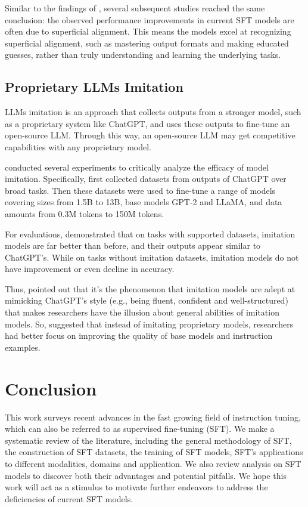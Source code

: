 \documentclass[11pt]{article}
\begin{document}
Similar to the findings of \citet{Kung2023DoMR}, several subsequent studies \cite{Zhou2023LIMALI, lin2023unlocking} reached the same conclusion: the observed performance improvements in current SFT models are often due to superficial alignment. This means the models excel at recognizing superficial alignment, such as mastering output formats and making educated guesses, rather than truly understanding and learning the underlying tasks.


\subsection{Proprietary LLMs Imitation}
LLMs imitation is an approach that collects outputs from a stronger model, such as a proprietary system like ChatGPT, and uses these outputs to fine-tune an open-source LLM. Through this way, an open-source LLM may get competitive capabilities with any proprietary model.

\citet{gudibande2023false} conducted several experiments to critically analyze the efficacy of model imitation. Specifically, \citet{gudibande2023false} first collected datasets from outputs of ChatGPT over broad tasks. Then these datasets were used to fine-tune a range of models covering sizes from 1.5B to 13B, base models GPT-2 and LLaMA, and data amounts from 0.3M tokens to 150M tokens.

For evaluations, \citet{gudibande2023false} demonstrated that on tasks with supported datasets, imitation models are far better than before, and their outputs appear similar to ChatGPT's. While on tasks without imitation datasets, imitation models do not have improvement or even decline in accuracy. 

Thus, \citet{gudibande2023false} pointed out that it's the phenomenon that imitation models are adept at mimicking ChatGPT's style (e.g., being fluent, confident and well-structured) that makes researchers have the illusion about general abilities of imitation models. So, \citet{gudibande2023false} suggested that instead of imitating proprietary models, researchers had better focus on improving the quality of base models and instruction examples.

\section{Conclusion}
This work surveys recent advances in the fast growing field of instruction tuning, which can also be referred to as supervised fine-tuning (SFT). 
We make a systematic review of the literature, including the general methodology of SFT, 
the construction of SFT datasets, the training of SFT models, 
SFT's applications to different modalities, domains and application. 
We also review analysis on SFT models to discover both their advantages and potential pitfalls. 
We hope this work will 
act as a stimulus to motivate further endeavors to address the deficiencies of current SFT models. 
\end{document}
